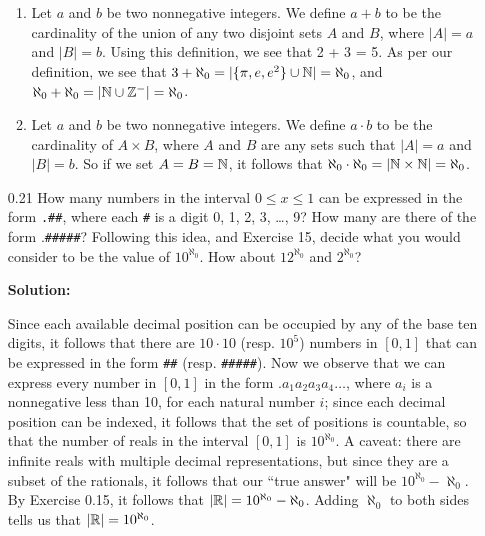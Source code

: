 \begin{enumerate}
      \begin{enumerate}
         \item Let $a$ and $b$ be two nonnegative integers. We define $a + b$ 
               to be the cardinality of the union of any two disjoint sets $A$ 
               and $B$, where $|A| = a$ and $|B| = b$. Using this definition, we
               see that 2 + 3 = 5. As per our definition, we see that
               $3 + \aleph_0 = |\{\pi, e, e^2\} \cup \mathbb{N}| = \aleph_0$, and
               $\aleph_0 + \aleph_0 = |\mathbb{N} \cup \mathbb{Z}^-| = \aleph_0$.
         \item Let $a$ and $b$ be two nonnegative integers. We define
               $a \cdot b$ to be the cardinality of $A \times B$, where $A$ and
               $B$ are any sets such that $|A| = a$ and $|B| = b$. So if we set
               $A = B = \mathbb{N}$, it follows that
               $\aleph_0 \cdot \aleph_0 = |\mathbb{N} \times \mathbb{N}| = \aleph_0$.
      \end{enumerate}
   \item[0.21] How many numbers in the interval $0 \le x \le 1$ can be expressed
               in the form \verb|.##|, where each \verb|#| is a digit
               0, 1, 2, 3, \ldots, 9? How many are there of the form
               .\verb|#####|? Following this idea, and Exercise 15, decide what 
               you would consider to be the value of $10^{\aleph_0}$. How about
               $12^{\aleph_0}$ and $2^{\aleph_0}$?

      \textbf{Solution:} 

      Since each available decimal position can be occupied by any of the base
      ten digits, it follows that there are $10 \cdot 10$ (resp. $10^5$) numbers
      in $[0, 1]$ that can be expressed in the form
      \verb|##| (resp. \verb|#####|). Now we observe that we can express every
      number in $[0, 1]$ in the form $.a_1a_2a_3a_4\ldots$, where $a_i$ is a
      nonnegative less than 10, for each natural number $i$; since each decimal
      position can be indexed, it follows that the set of positions is
      countable, so that the number of reals in the interval $[0, 1]$ is
      $10^{\aleph_0}$. A caveat: there are infinite reals with multiple decimal 
      representations, but since they are a subset of the rationals, it follows
      that our ``true answer" will be $10^{\aleph_0} - \aleph_0$. By Exercise
      0.15, it follows that $|\mathbb{R}| = 10^{\aleph_0} - \aleph_0$. Adding $\aleph_0$
      to both sides tells us that $|\mathbb{R}| = 10^{\aleph_0}$.


\end{enumerate}
